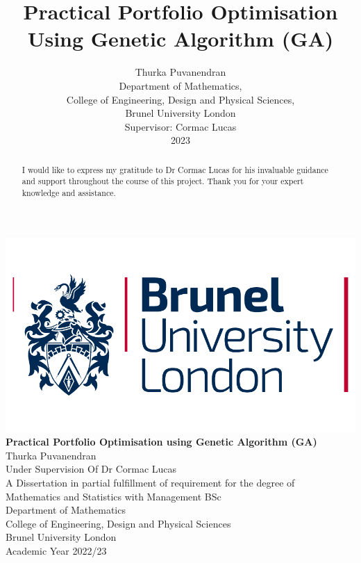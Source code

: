 \documentclass[12pt]{report}
\title{Practical Portfolio Optimisation Using Genetic Algorithm (GA)}
\author{Thurka Puvanendran \\ Department of Mathematics, \\
College of Engineering, Design and Physical Sciences, \\ Brunel University London
\\ Supervisor: Cormac Lucas \\ 2023}
\begin{document}
\begin{titlepage}
    \begin{center}
    \includegraphics[scale=0.37]{brunellogo.png}\\
    \huge
    \textbf{Practical Portfolio Optimisation using Genetic Algorithm (GA)}\\
    \vspace*{1cm}
    \LARGE   
    Thurka Puvanendran\\
    Under Supervision Of Dr Cormac Lucas\\
    \vfill
    \large  
    A Dissertation in partial fulfillment of requirement for the degree of \\ 
    Mathematics and Statistics with Management BSc\\ 
    Department of Mathematics\\ 
    College of Engineering, Design and Physical Sciences\\ 
    Brunel University London\\ 
    Academic Year 2022/23\\
\vspace*{1cm}
            
    \end{center}
\end{titlepage}
\renewcommand{\abstractname}{Acknowledgements}
\begin{abstract}
\centering
 I would like to express my gratitude to Dr Cormac Lucas for his invaluable guidance and support throughout the course of this project. Thank you for your expert knowledge and assistance.
\end{abstract}
\end{document}
